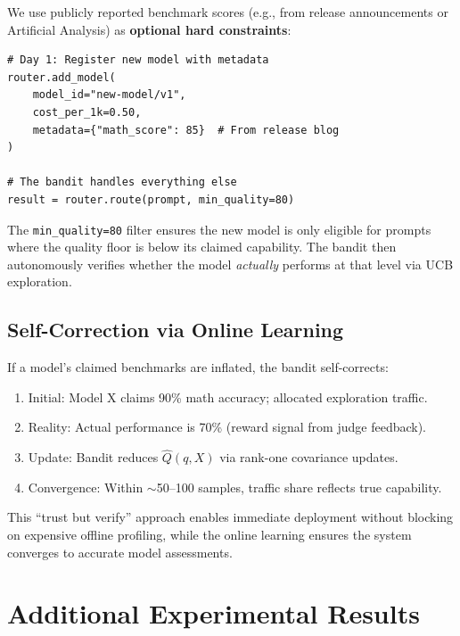 We use publicly reported benchmark scores (e.g., from release announcements or Artificial Analysis) as \textbf{optional hard constraints}:

\begin{verbatim}
# Day 1: Register new model with metadata
router.add_model(
    model_id="new-model/v1",
    cost_per_1k=0.50,
    metadata={"math_score": 85}  # From release blog
)

# The bandit handles everything else
result = router.route(prompt, min_quality=80)
\end{verbatim}

The \texttt{min\_quality=80} filter ensures the new model is only eligible for prompts where the quality floor is below its claimed capability. The bandit then autonomously verifies whether the model \emph{actually} performs at that level via UCB exploration.

\subsection{Self-Correction via Online Learning}

If a model's claimed benchmarks are inflated, the bandit self-corrects:

\begin{enumerate}[leftmargin=*,nosep]
    \item Initial: Model X claims 90\% math accuracy; allocated exploration traffic.
    \item Reality: Actual performance is 70\% (reward signal from judge feedback).
    \item Update: Bandit reduces $\hat{Q}(q, X)$ via rank-one covariance updates.
    \item Convergence: Within $\sim$50--100 samples, traffic share reflects true capability.
\end{enumerate}

This ``trust but verify'' approach enables immediate deployment without blocking on expensive offline profiling, while the online learning ensures the system converges to accurate model assessments.


\section{Additional Experimental Results}
\label{app:tables}


